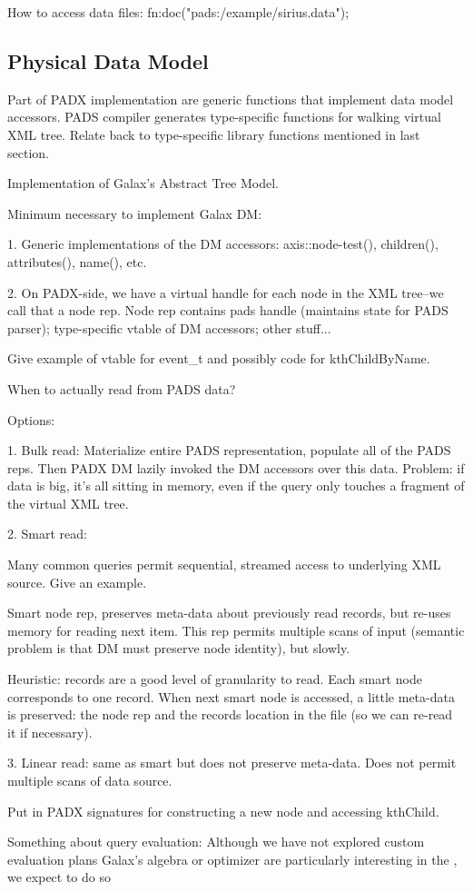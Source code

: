 How to access data files:  fn:doc("pads:/example/sirius.data");

\subsection{Physical Data Model}

Part of PADX implementation are generic functions that implement data
model accessors.  PADS compiler generates type-specific functions for
walking virtual XML tree.  Relate back to type-specific library
functions mentioned in last section.

Implementation of Galax's Abstract Tree Model.

Minimum necessary to implement Galax DM:

1. Generic implementations of the DM accessors: axis::node-test(), children(),
   attributes(), name(), etc. 

2. On PADX-side, we have a virtual handle for each node in the XML
   tree--we call that a node rep.  Node rep contains pads handle
   (maintains state for PADS parser); type-specific vtable of DM
   accessors; other stuff...

   Give example of vtable for event\_t and possibly code for
   kthChildByName. 

When to actually read from PADS data?

Options: 

1. Bulk read: Materialize entire PADS representation, populate all of the PADS
reps.  Then PADX DM lazily invoked the DM accessors over this data.
Problem: if data is big, it's all sitting in memory, even if the query
only touches a fragment of the virtual XML tree.

2. Smart read: 

Many common queries permit sequential, streamed access to underlying
XML source.  Give an example.  

Smart node rep, preserves meta-data about previously read records, but
re-uses memory for reading next item.  This rep permits multiple scans
of input (semantic problem is that DM must preserve node identity),
but slowly. 

Heuristic: records are a good level of granularity to read.   Each
smart node corresponds to one record.  When next smart node is
accessed, a little meta-data is preserved: the node rep and the
records location in the file (so we can re-read it if necessary).

3. Linear read: same as smart but does not preserve meta-data.
   Does not permit multiple scans of data source. 

Put in PADX signatures for constructing a new node and accessing
kthChild. 

Something about query evaluation:
Although we have not explored custom evaluation plans 
Galax's algebra or optimizer are particularly interesting in the 
\padx{}, we expect to do so 
